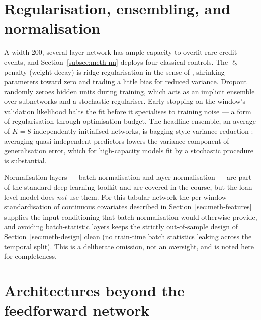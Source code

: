 \section{Regularisation, ensembling, and normalisation}
\label{sec:dlf-reg}

A width-200, several-layer network has ample capacity to overfit rare
credit events, and Section~\ref{subsec:meth-nn} deploys four classical
controls. The $\ell_2$ penalty (weight decay) is ridge regularisation
in the sense of \citet{hastie2009}, shrinking parameters toward zero and
trading a little bias for reduced variance. Dropout
\citep{dropout} randomly zeroes hidden units during training, which
acts as an implicit ensemble over subnetworks and a stochastic
regulariser. Early stopping on the window's validation likelihood halts
the fit before it specialises to training noise --- a form of
regularisation through optimisation budget. The headline ensemble, an
average of $K{=}8$ independently initialised networks, is bagging-style
variance reduction \citep{hastie2009}: averaging quasi-independent
predictors lowers the variance component of generalisation error, which
for high-capacity models fit by a stochastic procedure is substantial.

Normalisation layers --- batch normalisation \citep{ioffe2015} and layer
normalisation \citep{ba2016} --- are part of the standard deep-learning
toolkit and are covered in the course, but the loan-level model does
\emph{not} use them. For this tabular network the per-window
standardisation of continuous covariates described in
Section~\ref{sec:meth-features} supplies the input conditioning that
batch normalisation would otherwise provide, and avoiding
batch-statistic layers keeps the strictly out-of-sample design of
Section~\ref{sec:meth-design} clean (no train-time batch statistics
leaking across the temporal split). This is a deliberate omission, not
an oversight, and is noted here for completeness.

\section{Architectures beyond the feedforward network}
\label{sec:dlf-arch}

